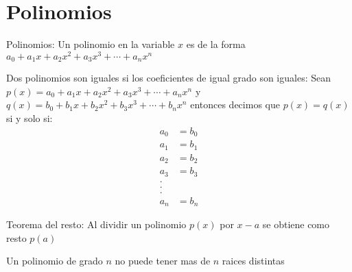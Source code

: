 %
%
%
% 
% 
%
\section{Polinomios}
\begin{defi}{Polinomios:}
   Un polinomio en la variable $x$ es de la forma $a_0 + a_1 x + a_2 x^2 + a_3 x^3 + \cdots + a_n x^n$
\end{defi}
\begin{defi}
   Dos polinomios son iguales si los coeficientes de igual grado son iguales: Sean $p(x) = a_0 + a_1 x + a_2 x^2 + a_3 x^3 + \cdots + a_n x^n$ y 
   $q(x) = b_0 + b_1 x + b_2 x^2 + b_3 x^3 + \cdots + b_n x^n$ entonces decimos que $p(x) = q(x)$ si y solo si:
   \begin{align}
      a_0 &= b_0\\
      a_1 &= b_1\\
      a_2 &= b_2\\
      a_3 &= b_3\\
      .\\
      .\\
      .\\
      a_n &= b_n
   \end{align}
\end{defi}

\begin{teo}{Teorema del resto:}
   Al dividir un polinomio $p(x)$ por $x-a$ se obtiene como resto $p(a)$
\end{teo}
\begin{teo}
   Un polinomio de grado $n$ no puede tener mas de $n$ raices distintas
\end{teo}

